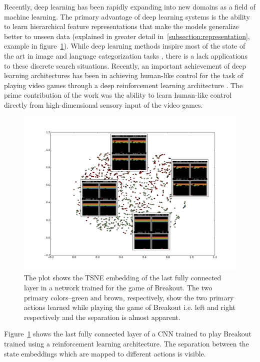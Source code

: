 Recently, deep learning has been rapidly expanding into new domains as a field 
of machine learning. The primary advantage of deep learning systems is the 
ability to learn hierarchical feature representations that make the models 
generalize better to unseen data (explained in greater detail 
in~\ref{subsection:representation}, example in 
figure~\ref{figure:deepmind-fc}). While deep learning methods inspire most of 
the state of the art in image and language categorization tasks 
\cite{krizhevsky2012imagenet,tompson2014efficient,taigman2014deepface,
ciresan2012multi}, there is a lack applications to these discrete search 
situations. Recently, an important achievement of deep learning architectures 
has been in achieving human-like control for the task of playing video games 
through a deep reinforcement learning architecture \cite{deepmind_nips}. The 
prime contribution of the work was the ability to learn human-like control 
directly from high-dimensional sensory input of the video 
games.\label{discussion:deepmind}
\begin{figure}[h]
 \centering
 \includegraphics[width=1.1\textwidth, 
scale=0.8]{plots/tsne_breakout_new3_big.pdf}
 
 \caption[Fully connected layer's TSNE embedding in Deepmind's network]{The 
plot shows the TSNE embedding of the last fully connected layer in a network 
trained for the game of Breakout. The two primary colors--green and brown, 
respectively, show the two primary actions learned while playing the game of 
Breakout i.e. left and right respectively and the separation is almost 
apparent. }
\label{figure:deepmind-fc}
\end{figure}
Figure~\ref{figure:deepmind-fc} shows the last fully connected 
layer of a CNN trained to play Breakout trained using a reinforcement learning 
architecture. The separation between the state embeddings which are mapped to 
different actions is visible.\\

